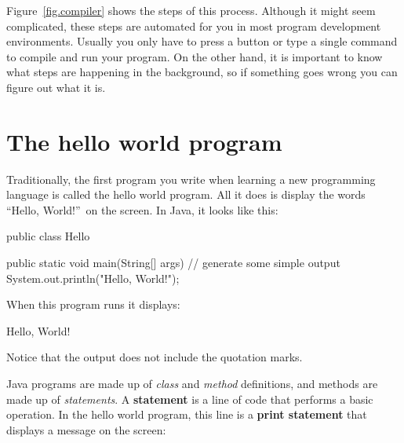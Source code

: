 \documentclass[12pt]{book}
\theoremstyle{exercise}
\newcommand{\java}{\verb}%}
\begin{document}
Figure~\ref{fig.compiler} shows the steps of this process.
Although it might seem complicated, these steps are automated for you in most program development environments.
Usually you only have to press a button or type a single command to compile and run your program.
On the other hand, it is important to know what steps are happening in the background, so if something goes wrong you can figure out what it is.


\section{The hello world program}
\label{hello}


Traditionally, the first program you write when learning a new programming language is called the hello world program.
All it does is display the words ``Hello, World!''\ on the screen.
In Java, it looks like this:


\begin{code}
public class Hello {

    public static void main(String[] args) {
        // generate some simple output
        System.out.println("Hello, World!");
    }
}
\end{code}

When this program runs it displays:

\begin{stdout}
Hello, World!
\end{stdout}

Notice that the output does not include the quotation marks.




Java programs are made up of {\em class} and {\em method} definitions, and methods are made up of {\em statements}.
A {\bf statement} is a line of code that performs a basic operation.
In the hello world program, this line is a {\bf print statement} that displays a message on the screen:
\end{document}
